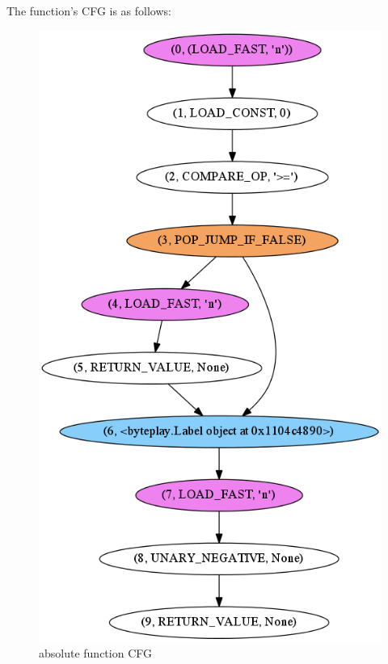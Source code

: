 \documentclass{icldt}
\numberwithin{equation}{section}       %
\begin{document}
{{The function's CFG is as follows:
\begin{figure}[H]
	\centering
	\includegraphics[scale=.39]{img/abs.png}
	\caption{absolute function CFG}
	\label{fig:abs-fn-cfg}
\end{figure}

}}
\end{document}
